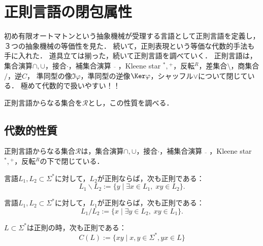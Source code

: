 \section{正則言語の閉包属性}\label{sec-closure-properties-of-regular-languages}

\begin{tcolorbox}[colframe=ForestGreen, colback=ForestGreen!10!white, breakable]
    初め有限オートマトンという抽象機械が受理する言語として正則言語を定義し，３つの抽象機械の等価性を見た．
    続いて，正則表現という等価な代数的手法も手に入れた．
    道具立ては揃った，続いて正則言語を調べていく．
    正則言語は，集合演算$\cap,\cup$，接合$\cdot$，補集合演算$\overline{\quad}$，Kleene star ${}^*,{}^+$，反転${}^R$，差集合$\setminus$，商集合$/$，逆$C$，
    準同型の像$\Im\varphi$，準同型の逆像$\Ker\varphi$，シャッフル$\lor$について閉じている．
    極めて代数的で扱いやすい！！
\end{tcolorbox}

\begin{notation}
    正則言語からなる集合を$\mathcal{R}$とし，この性質を調べる．
\end{notation}

\subsection{代数的性質}

\begin{theorem}[代数的性質]\label{thm-closure-properties-of-regular-language}
    正則言語からなる集合$\mathcal{R}$は，集合演算$\cap,\cup$，接合$\cdot$，補集合演算$\overline{\quad}$，Kleene star ${}^*,{}^+$，反転${}^R$の下で閉じている．
\end{theorem}

\begin{theorem}[差集合]
    言語$L_1,L_2\subset\Sigma^*$に対して，$L_2$が正則ならば，次も正則である：
    \[ L_1\backslash L_2:=\{y\mid\exists x\in L_1,\;xy\in L_2\}. \]
\end{theorem}

\begin{theorem}[商集合]
    言語$L_1,L_2\subset\Sigma^*$に対して，$L_1$が正則ならば，次も正則である：
    \[ L_1/ L_2:=\{x\mid\exists y\in L_2,\;xy\in L_1\}. \]
\end{theorem}

\begin{theorem}
    $L\subset\Sigma^*$は正則の時，次も正則である：
    \[ C(L):=\{xy\mid x,y\in\Sigma^*,yx\in L\} \]
\end{theorem}

